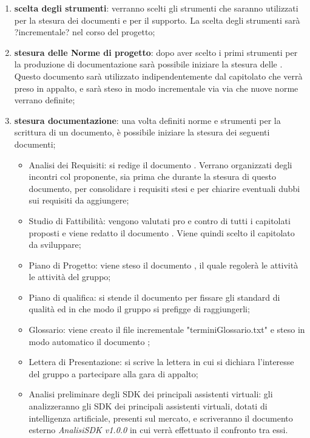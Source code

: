 \documentclass[./PianoDiProgetto.tex]{subfiles}
\begin{document}
  \begin{enumerate}
		\item \textbf{scelta degli strumenti}: verranno scelti gli strumenti che saranno utilizzati per la stesura dei documenti e per il supporto. La scelta degli strumenti sarà ?incrementale? nel corso del progetto;
		\item \textbf{stesura delle Norme di progetto}: dopo aver scelto i primi strumenti per la produzione di documentazione sarà possibile iniziare la stesura delle \NPdocRR. Questo documento sarà utilizzato indipendentemente dal capitolato che verrà preso in appalto, e sarà steso in modo incrementale via via che nuove norme verrano definite;
		\item \textbf{stesura documentazione}: una volta definiti norme e strumenti per la scrittura di un documento, è possibile iniziare la stesura dei seguenti documenti;
    \begin{itemize}
      \item Analisi dei Requisiti: si redige il documento \ARdocRR. Verrano organizzati degli incontri col proponente, sia prima che durante la stesura di questo documento, per consolidare i requisiti stesi e per chiarire eventuali dubbi sui requisiti da aggiungere;
      \item Studio di Fattibilità: vengono valutati pro e contro di tutti i capitolati proposti e viene redatto il documento \SFdocRR. Viene quindi scelto il capitolato da sviluppare;
      \item Piano di Progetto: viene steso il documento \PPdocRR, il quale regolerà le attività le attività del gruppo;
      \item Piano di qualifica: si stende il documento \PQdocRR per fissare gli standard di qualità ed in che modo il gruppo si prefigge di raggiungerli;
      \item Glossario: viene creato il file incrementale "terminiGlossario.txt" e steso in modo automatico il documento \GldocRR;
      \item Lettera di Presentazione: si scrive la lettera in cui si dichiara l'interesse del gruppo a partecipare alla gara di appalto;
      \item Analisi preliminare degli SDK dei principali assistenti virtuali: gli \ANP{} analizzeranno gli SDK dei principali assistenti virtuali, dotati di intelligenza artificiale, presenti sul mercato, e scriveranno il documento esterno \textit{AnalisiSDK v1.0.0} in cui verrà effettuato il confronto tra  essi.
    \end{itemize}
  \end{enumerate}
  \newpage
\end{document}
